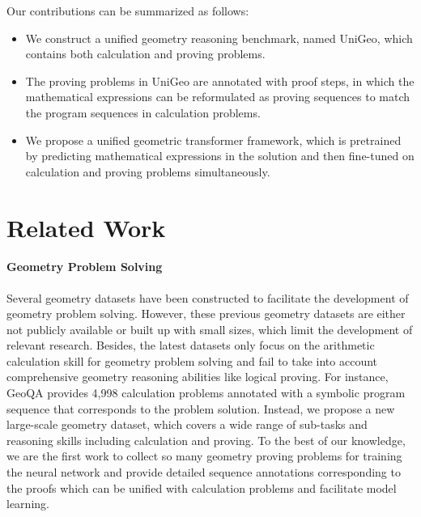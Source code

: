 \documentclass[11pt]{article}
\begin{document}
Our contributions can be summarized as follows:
\begin{itemize} \setlength{\itemsep}{0pt}
\setlength{\parsep}{0pt}
\setlength{\parskip}{0pt}
    \item We construct a unified geometry reasoning benchmark, named UniGeo, which contains both calculation and proving problems. 
    \item The proving problems in UniGeo are annotated with proof steps, in which the mathematical expressions can be reformulated as proving sequences to match the program sequences in calculation problems.
    \item We propose a unified geometric transformer framework, which is pretrained by predicting mathematical expressions in the solution and then fine-tuned on calculation and proving problems simultaneously.
\end{itemize}


\section{Related Work}
\paragraph{Geometry Problem Solving}

Several geometry datasets \cite{seo2014diagram,seo2015solving,sachan2017textbooks,alvin2017synthesis,sachan2017learning} have been constructed to facilitate the development of geometry problem solving. However, these previous geometry datasets are either not publicly available or built up with small sizes, which limit the development of relevant research. Besides, the latest datasets \cite{lu2021inter, chen2021geoqa, cao2022augmented} only focus on the arithmetic calculation skill for geometry problem solving and fail to take into account comprehensive geometry reasoning abilities like logical proving. 
For instance, GeoQA \cite{chen2021geoqa} provides 4,998 calculation problems annotated with a symbolic program sequence that corresponds to the problem solution.
Instead, we propose a new large-scale geometry dataset, which covers a wide range of sub-tasks and reasoning skills including calculation and proving.
To the best of our knowledge, we are the first work to collect so many geometry proving problems for training the neural network and provide detailed sequence annotations corresponding to the proofs which can be unified with calculation problems and facilitate model learning.
 
\end{document}
